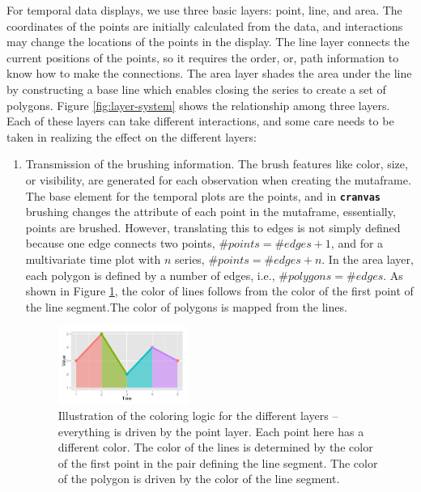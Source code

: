 \documentclass[12pt]{article}
\begin{document}
For temporal data displays, we use three basic layers: point, line, and area. The coordinates of the points are initially calculated from the data, and interactions may change the locations of the points in the display. The line layer connects the current positions of the points, so it requires the order, or, path information to know how to make the connections. The area layer shades the area under the line by constructing a base line which enables closing the series to create a set of polygons.  Figure \ref{fig:layer-system} shows the relationship among three layers. Each of these layers can take different interactions, and some care needs to be taken in realizing the effect on the different layers:

\begin{enumerate}
\item Transmission of the brushing information. The brush features like color, size, or visibility, are generated for each observation when creating the mutaframe\citep{plumbr2014,xie2014reactive}.
The base element for the temporal plots are the points, and in \texttt{\textbf{cranvas}} brushing changes the attribute of each point in the mutaframe, essentially, points are brushed. However, translating this to edges is not simply defined because one edge connects two points, $\# points=\# edges+1$, and for a multivariate time plot with $n$ series, 
$\# points=\#edges+n.$
In the area layer, each polygon is defined by a number of edges,
i.e., $\#polygons=\#edges$.
As shown in Figure \ref{fig:features}, the color of lines follows from the color of the first point of the line segment.The color of polygons is mapped from the lines.

\begin{center}
\begin{figure}[H]
\begin{centering}
\includegraphics[width=0.4\textwidth]{graph/pipeline-13-layer-features}
\par\end{centering}
\caption{\label{fig:features}Illustration of the coloring logic for the different layers -- everything is driven by the point layer. Each point here has a different color. The color of the lines is determined by the color of the first point in the pair defining the line segment. The color of the polygon is driven by the color of the line segment.}
\end{figure}
\par\end{center}


\end{enumerate}
\end{document}
